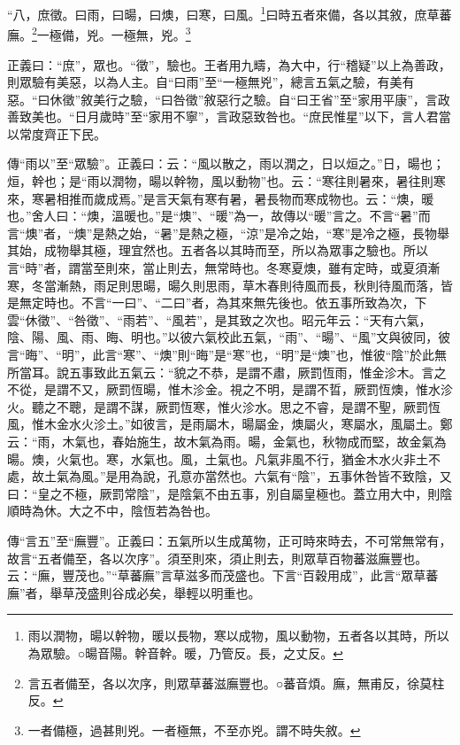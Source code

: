 “八，庶徵。曰雨，曰暘，曰燠，曰寒，曰風。\footnote{雨以潤物，暘以幹物，暖以長物，寒以成物，風以動物，五者各以其時，所以為眾驗。○暘音陽。幹音幹。暖，乃管反。長，之丈反。}曰時五者來備，各以其敘，庶草蕃廡。\footnote{言五者備至，各以次序，則眾草蕃滋廡豐也。○蕃音煩。廡，無甫反，徐莫柱反。}一極備，兇。一極無，兇。\footnote{一者備極，過甚則兇。一者極無，不至亦兇。謂不時失敘。}

{\noindent\shu{}\fzkt 正義曰：“庶”，眾也。“徵”，驗也。王者用九疇，為大中，行“稽疑”以上為善政，則眾驗有美惡，以為人主。自“曰雨”至“一極無兇”，總言五氣之驗，有美有惡。“曰休徵”敘美行之驗，“曰咎徵”敘惡行之驗。自“曰王省”至“家用平康”，言政善致美也。“日月歲時”至“家用不寧”，言政惡致咎也。“庶民惟星”以下，言人君當以常度齊正下民。 \par}

{\noindent\zhuan{}\fzbyks 傳“雨以”至“眾驗”。正義曰：云：“風以散之，雨以潤之，日以烜之。”日，暘也；烜，幹也；是“雨以潤物，暘以幹物，風以動物”也。云：“寒往則暑來，暑往則寒來，寒暑相推而歲成焉。”是言天氣有寒有暑，暑長物而寒成物也。云：“燠，暖也。”舍人曰：“燠，溫暖也。”是“燠”、“暖”為一，故傳以“暖”言之。不言“暑”而言“燠”者，“燠”是熱之始，“暑”是熱之極，“涼”是冷之始，“寒”是冷之極，長物舉其始，成物舉其極，理宜然也。五者各以其時而至，所以為眾事之驗也。所以言“時”者，謂當至則來，當止則去，無常時也。冬寒夏燠，雖有定時，或夏須漸寒，冬當漸熱，雨足則思暘，暘久則思雨，草木春則待風而長，秋則待風而落，皆是無定時也。不言“一曰”、“二曰”者，為其來無先後也。依五事所致為次，下雲“休徵”、“咎徵”、“雨若”、“風若”，是其致之次也。昭元年云：“天有六氣，陰、陽、風、雨、晦、明也。”以彼六氣校此五氣，“雨”、“暘”、“風”文與彼同，彼言“晦”、“明”，此言“寒”、“燠”則“晦”是“寒”也，“明”是“燠”也，惟彼“陰”於此無所當耳。說五事致此五氣云：“貌之不恭，是謂不肅，厥罰恆雨，惟金沴木。言之不從，是謂不又，厥罰恆暘，惟木沴金。視之不明，是謂不晢，厥罰恆燠，惟水沴火。聽之不聰，是謂不謀，厥罰恆寒，惟火沴水。思之不睿，是謂不聖，厥罰恆風，惟木金水火沴土。”如彼言，是雨屬木，暘屬金，燠屬火，寒屬水，風屬土。鄭云：“雨，木氣也，春始施生，故木氣為雨。暘，金氣也，秋物成而堅，故金氣為暘。燠，火氣也。寒，水氣也。風，土氣也。凡氣非風不行，猶金木水火非土不處，故土氣為風。”是用為說，孔意亦當然也。六氣有“陰”，五事休咎皆不致陰，又曰：“皇之不極，厥罰常陰”，是陰氣不由五事，別自屬皇極也。蓋立用大中，則陰順時為休。大之不中，陰恆若為咎也。 \par}

{\noindent\zhuan{}\fzbyks 傳“言五”至“廡豐”。正義曰：五氣所以生成萬物，正可時來時去，不可常無常有，故言“五者備至，各以次序”。須至則來，須止則去，則眾草百物蕃滋廡豐也。云：“廡，豐茂也。”“草蕃廡”言草滋多而茂盛也。下言“百穀用成”，此言“眾草蕃廡”者，舉草茂盛則谷成必矣，舉輕以明重也。 \par}

